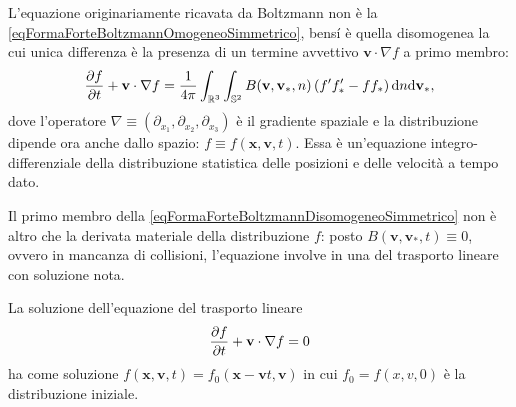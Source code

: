             L'equazione originariamente ricavata da Boltzmann non è la \eqref{eqFormaForteBoltzmannOmogeneoSimmetrico}, bensí è quella disomogenea la cui unica differenza è la presenza di un termine avvettivo \(\mathbf v\cdot\nabla f\) a primo membro:
            \begin{equation}
                \label{eqFormaForteBoltzmannDisomogeneoSimmetrico}
                \frac{\partial f}{\partial t}+\mathbf v\cdot\nabla f
                =\frac1{4\pi}\int_{\mathbb R^3}\int_{\mathbb S^2}
                B(\mathbf v,\mathbf v_*,n)\left(f'f'_*-ff_*\right)
                \mathrm{d} n\mathrm{d}\mathbf v_*,
            \end{equation}
            dove l'operatore \(\nabla\equiv(\partial_{x_1},\partial_{x_2},\partial_{x_3})\) è il gradiente spaziale e la distribuzione dipende ora anche dallo spazio: \(f\equiv f(\mathbf x,\mathbf v,t)\). Essa è un'equazione integro-differenziale della distribuzione statistica delle posizioni e delle velocità a tempo dato.

            Il primo membro della \eqref{eqFormaForteBoltzmannDisomogeneoSimmetrico} non è altro che la derivata materiale della distribuzione \(f\): posto \(B(\mathbf v,\mathbf v_*,t)\equiv0\), ovvero in mancanza di collisioni, l'equazione involve in una del trasporto lineare con soluzione nota.
            
            \begin{prp}
                La soluzione dell'equazione del trasporto lineare
                \begin{equation}
                    \label{eqTrasportoLineare}
                    \frac{\partial f}{\partial t}+\mathbf v\cdot\nabla f=0
                \end{equation}
                ha come soluzione \(f(\mathbf x,\mathbf v,t)=f_0(\mathbf x-\mathbf vt,\mathbf v)\) in cui \(f_0=f(x,v,0)\) è la distribuzione iniziale.
            \end{prp}

